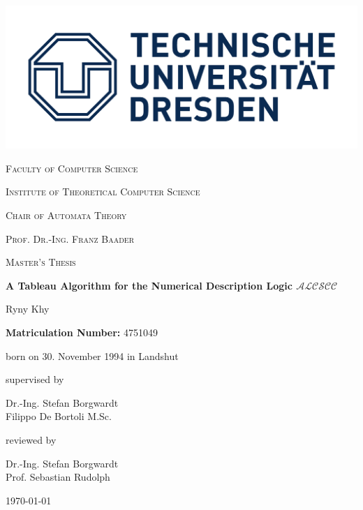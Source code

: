 \documentclass{book}
\theoremstyle{break}
\theoremstyle{definition}
\begin{document}
\begin{titlepage}
	\centering
	\vspace{-0.1cm}
	\includegraphics[scale=0.15]{logo}\\
	{\scshape\Large Faculty of Computer Science \par}
	\vspace{0.5cm}
	{\scshape\Large Institute of Theoretical Computer Science \par}
	\vspace{0.5cm}
	{\scshape\Large Chair of Automata Theory \par}
	\vspace{0.5cm}
	{\scshape\Large Prof. Dr.-Ing. Franz Baader \par}
	\vspace{1.5cm}
	{\scshape\large Master's Thesis\par}
	\vspace{1.5cm}
	{\LARGE\bfseries A Tableau Algorithm for the Numerical Description Logic $\mathcal{ALCSCC}$\par}
	\vspace{1.6cm}
	{\Large Ryny Khy\par}
	\vspace{0.5cm}
	\textbf{Matriculation Number:} 4751049\par
	born on 30. November 1994 in Landshut
	\vspace{0.5cm}
	\vfill
	\begin{minipage}[t]{.65\textwidth}
\raggedright
supervised by\par
	Dr.-Ing. Stefan Borgwardt\\
	Filippo De Bortoli M.Sc.
	\vfill
\end{minipage}%
\begin{minipage}[t]{.35\textwidth}
\raggedright
	reviewed by\par
	Dr.-Ing. Stefan Borgwardt\\
	Prof. Sebastian Rudolph\\

\end{minipage}

	\vfill

	{\large \today\par}
\end{titlepage}
\end{document}

